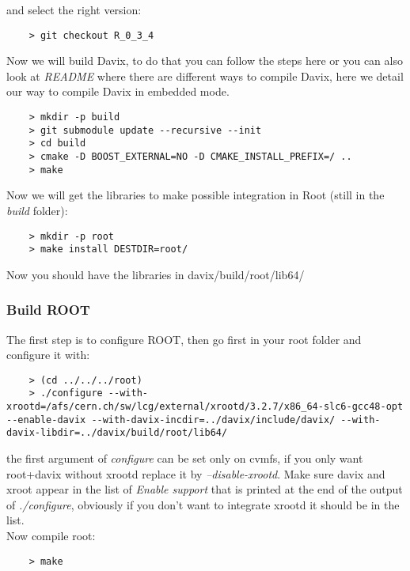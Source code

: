 and select the right version:


\begin{lstlisting}
	> git checkout R_0_3_4
\end{lstlisting}

Now we will build Davix, to do that you can follow the steps here or you can also look at \textit{README} where there are different ways to compile Davix, here we detail our way to compile Davix in embedded mode.


\begin{lstlisting}
	> mkdir -p build
	> git submodule update --recursive --init
	> cd build
	> cmake -D BOOST_EXTERNAL=NO -D CMAKE_INSTALL_PREFIX=/ ..
	> make
\end{lstlisting}

Now we will get the libraries to make possible integration in Root (still in the \textit{build} folder):


\begin{lstlisting}
	> mkdir -p root
	> make install DESTDIR=root/
\end{lstlisting}

Now you should have the libraries in davix/build/root/lib64/

\subsubsection{Build ROOT}

The first step is to configure ROOT, then go first in your root folder and configure it with:

\begin{lstlisting}
	> (cd ../../../root)
	> ./configure --with-xrootd=/afs/cern.ch/sw/lcg/external/xrootd/3.2.7/x86_64-slc6-gcc48-opt --enable-davix --with-davix-incdir=../davix/include/davix/ --with-davix-libdir=../davix/build/root/lib64/
\end{lstlisting}

the first argument of \textit{configure} can be set only on cvmfs, if you only want root+davix without xrootd replace it by \textit{--disable-xrootd}. Make sure davix and xroot appear in the list of \textit{Enable support} that is printed at the end of the output of \textit{./configure}, obviously if you don't want to integrate xrootd it should be in the list.\\

Now compile root:

\begin{lstlisting}
	> make
\end{lstlisting}

